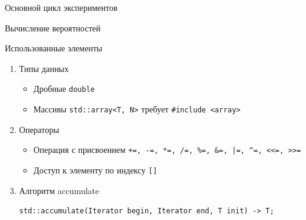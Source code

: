 \documentclass[unknownkeysallowed]{beamer}
\makeatletter
\newcommand{\srcsmallsize}{\@setfontsize{\srcsmallsize}{5pt}{5pt}}
\makeatother
\begin{document}
\begin{frame}[fragile]{Основной цикл экспериментов}



\end{frame}

\begin{frame}[fragile]{Вычисление вероятностей}



\end{frame}

\begin{frame}[fragile]{Использованные элементы}

\begin{enumerate}

\item Типы данных

\begin{itemize}
  \item Дробные \lstinline[basicstyle=\ttfamily\small]{double}
  \item Массивы \lstinline[basicstyle=\ttfamily\small]{std::array<T, N>} требует \lstinline[basicstyle=\ttfamily\small]{#include <array>}
\end{itemize}

\item Операторы

\begin{itemize}
  \item Операция с присвоением \lstinline[basicstyle=\ttfamily\small]{+=, -=, *=, /=, %=, &=, |=, ^=, <<=, >>=}
  \item Доступ к элементу по индексу \lstinline[basicstyle=\ttfamily\small]{[]}
\end{itemize}

\item Алгоритм accumulate
\begin{lstlisting}[basicstyle=\ttfamily\small]
std::accumulate(Iterator begin, Iterator end, T init) -> T;
\end{lstlisting}

\end{enumerate}

\end{frame}
\end{document}
